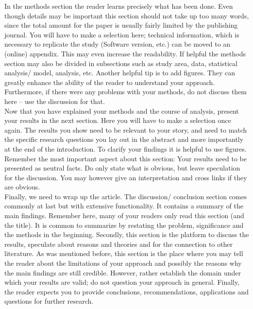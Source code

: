 \documentclass[justified, notoc]{tufte-book} %
\begin{document}
In the methods section the reader learns precisely what has been done. Even though details may be important this section should not take up too many words, since the total amount for the paper is usually fairly limited by the publishing journal. You will have to make a selection here; technical information, which is necessary to replicate the study (Software version, etc.) can be moved to an (online) appendix. This may even increase the readability. If helpful the methods section may also be divided in subsections such as study area, data, statistical analysis/ model, analysis, etc. Another helpful tip is to add figures. They can greatly enhance the ability of the reader to understand your approach. Furthermore, if there were any problems with your methods, do not discuss them here -- use the discussion for that.\\

Now that you have explained your methods and the course of analysis, present your results in the next section. Here you will have to make a selection once again. The results you show need to be relevant to your story, and need to match the specific research questions you lay out in the abstract and more importantly at the end of the introduction. To clarify your findings it is helpful to use figures.
Remember the most important aspect about this section: Your results need to be presented as neutral facts. Do only state what is obvious, but leave speculation for the discussion. You may however give an interpretation and cross links if they are obvious.\\

Finally, we need to wrap up the article. The discussion/ conclusion section comes commonly at last but with extensive functionality. It contains a summary of the main findings. Remember here, many of your readers only read this section (and the title). It is common to summarize by restating the problem, significance and the methods in the beginning. Secondly, this section is the platform to discuss the results, speculate about reasons and theories and for the connection to other literature.
As was mentioned before, this section is the place where you may tell the reader about the limitations of your approach and possibly the reasons why the main findings are still credible. However, rather establish the domain under which your results are valid; do not question your approach in general. Finally, the reader expects you to provide conclusions, recommendations, applications and questions for further research.\\
\end{document}
